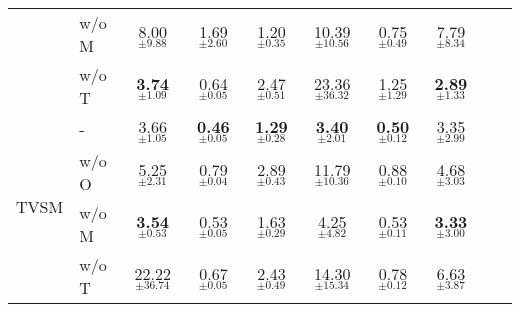 \begin{table}[t]
\begin{center}
\begin{small}
\begin{sc}
\begin{tabular}{llcccccccc}
                             & w/o M & 8.00$_{\pm 9.88}$ & 1.69$_{\pm 2.60}$ & 1.20$_{\pm 0.35}$ & 10.39$_{\pm 10.56}$ & 0.75$_{\pm 0.49}$ & 7.79$_{\pm 8.34}$ & \\
                             & w/o T & \textbf{3.74}$_{\pm \mathbf{1.09}}$ & 0.64$_{\pm 0.05}$ & 2.47$_{\pm 0.51}$ & 23.36$_{\pm 36.32}$ & 1.25$_{\pm 1.29}$ & \textbf{2.89}$_{\pm \mathbf{1.33}}$ & \\
\midrule
\multirow{4}{*}{TVSM} & -     & 3.66$_{\pm 1.05}$ & \textbf{0.46}$_{\pm \mathbf{0.05}}$ & \textbf{1.29}$_{\pm \mathbf{0.28}}$ & \textbf{3.40}$_{\pm \mathbf{2.01}}$ & \textbf{0.50}$_{\pm \mathbf{0.12}}$ & 3.35$_{\pm 2.99}$ & \\
                             & w/o O & 5.25$_{\pm 2.31}$ & 0.79$_{\pm 0.04}$ & 2.89$_{\pm 0.43}$ & 11.79$_{\pm 10.36}$ & 0.88$_{\pm 0.10}$ & 4.68$_{\pm 3.03}$ & \\
                             & w/o M & \textbf{3.54}$_{\pm \mathbf{0.53}}$ & 0.53$_{\pm 0.05}$ & 1.63$_{\pm 0.29}$ & 4.25$_{\pm 4.82}$ & 0.53$_{\pm 0.11}$ & \textbf{3.33}$_{\pm \mathbf{3.00}}$ & \\
                             & w/o T & 22.22$_{\pm 36.74}$ & 0.67$_{\pm 0.05}$ & 2.43$_{\pm 0.49}$ & 14.30$_{\pm 15.34}$ & 0.78$_{\pm 0.12}$ & 6.63$_{\pm 3.87}$ & \\
\bottomrule
\end{tabular}
\end{sc}
\end{small}
\end{center}
\vskip -0.1in
\end{table}
